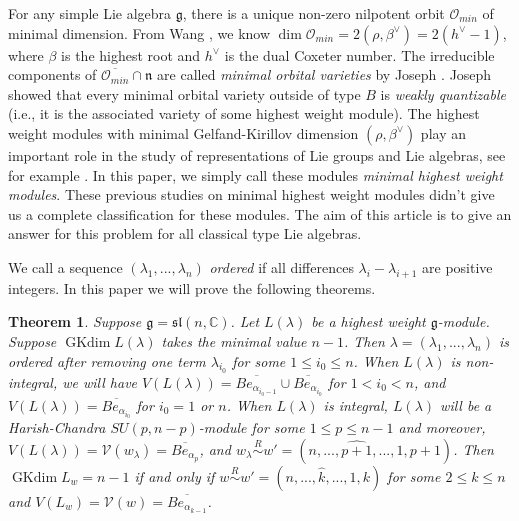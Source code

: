\documentclass{amsart}[12pt]
\newtheorem{Thm}[Lem]{Theorem}
\newcommand{\gkd}{\operatorname{GKdim}}
\numberwithin{equation}{section}
\begin{document}
For any simple Lie algebra $\mathfrak{g}$, there is a unique non-zero nilpotent orbit $\mathcal{O}_{min}$ of minimal dimension. From Wang \cite{Wang}, we know $\dim {\mathcal {O}}_{min}=2(\rho, \beta^{\vee})=2(h^{\vee}-1)$, where $\beta$ is the highest root and $h^{\vee}$ is the dual Coxeter number. The irreducible components of $\overline{\mathcal{O}_{min}}\cap \mathfrak{n}$ are called \emph{minimal orbital varieties} by Joseph \cite{Jo98}. Joseph showed that every minimal orbital variety outside of type $B$ is \emph{weakly quantizable} (i.e., it is the associated variety of some highest weight module). The highest weight modules with minimal Gelfand-Kirillov dimension $(\rho, \beta^{\vee})$ play an important role in the study of representations of Lie groups and Lie algebras, see for example \cite{BBL, GS, Jo98, Li, Ma,Sun}. In this paper, we simply call these modules \emph{minimal highest weight modules}. These previous studies on minimal highest weight modules didn't give us a complete classification for these modules. The aim of this article is to give an answer for this problem for all classical type Lie algebras.






We call a sequence $(\lambda_1,...,\lambda_n)$  \emph{ordered} if all differences $\lambda_i-\lambda_{i+1}$ are positive integers. In this paper we will prove the following theorems.

\begin{Thm}\label{m2} Suppose $\mathfrak{g}=\mathfrak{sl}(n, \mathbb{C})$. Let $L(\lambda)$ be a highest weight $\mathfrak{g}$-module. Suppose $\gkd L(\lambda)$ takes the minimal value $n-1$. Then $\lambda=(\lambda_1,...,\lambda_n)$ is ordered after removing one term $\lambda_{i_0}$ for some $1\leq i_0\leq n$. 
When $L(\lambda)$ is non-integral, we will have $V(L(\lambda))=\overline{Be_{\alpha_{i_0-1}}}\cup \overline{Be_{\alpha_{i_0}}}$ for $1<i_0<n$, and  $V(L(\lambda))=\overline{Be_{\alpha_{i_0}}}$ for $i_0=1$ or $n$.	
	When $L(\lambda)$ is integral, $L(\lambda)$ will be a Harish-Chandra $SU(p,n-p)$-module for some $1\leq p\leq n-1$ and
	moreover, $V(L(\lambda))=\mathcal{V}(w_{\lambda})=\overline{Be_{\alpha_{p}}}$, and $w_{\lambda}\stackrel{R}{\sim} w'=(n,...,{\widehat{p+1}},...,1,p+1)$. Then $\gkd L_w=n-1$ if and only if   $w \stackrel{R}{\sim} w'=(n,...,\hat{k},...,1,k)$  for  some  $2\leq k\leq n$ and  $V(L_w)=\mathcal{V}(w)=\overline{Be_{\alpha_{k-1}}}$.

	
\end{Thm}
\end{document}

